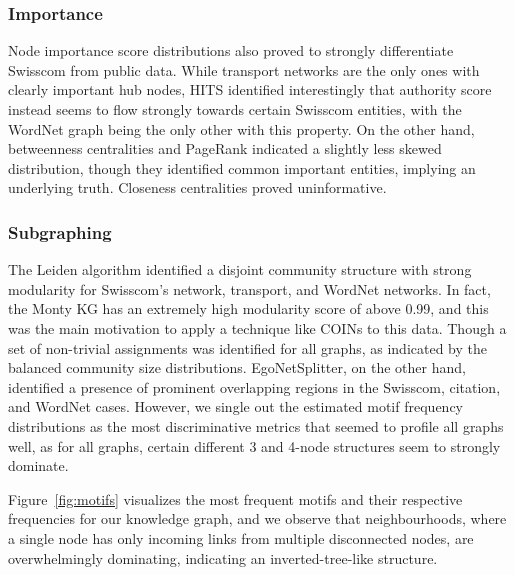 \subsubsection{Importance} 
Node importance score distributions also proved to strongly differentiate Swisscom from public data. While transport networks are the only ones with clearly important hub nodes, HITS identified interestingly that authority score instead seems to flow strongly towards certain Swisscom entities, with the WordNet graph being the only other with this property. On the other hand, betweenness centralities and PageRank indicated a slightly less skewed distribution, though they identified common important entities, implying an underlying truth. Closeness centralities proved uninformative.

\subsubsection{Subgraphing} The Leiden algorithm identified a disjoint community structure with strong modularity for Swisscom's network, transport, and WordNet networks. In fact, the Monty KG has an extremely high modularity score of above 0.99, and this was the main motivation to apply a technique like COINs to this data. Though a set of non-trivial assignments was identified for all graphs, as indicated by the balanced community size distributions. EgoNetSplitter, on the other hand, identified a presence of prominent overlapping regions in the Swisscom, citation, and WordNet cases. However, we single out the estimated motif frequency distributions as the most discriminative metrics that seemed to profile all graphs well, as for all graphs, certain different 3 and 4-node structures seem to strongly dominate. 

Figure~\ref{fig:motifs} visualizes the most frequent motifs and their respective frequencies for our knowledge graph, and we observe that neighbourhoods, where a single node has only incoming links from multiple disconnected nodes, are overwhelmingly dominating, indicating an inverted-tree-like structure.

